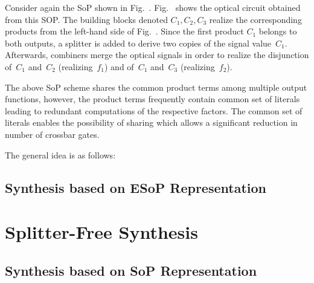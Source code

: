 \documentclass[10pt,letterpaper,twoside,openright]{book}
\begin{document}
\begin{example}
Consider again the SoP
shown in Fig.~.
Fig.~ shows the optical circuit obtained from this SOP.
The building blocks denoted $C_1, C_2, C_3$ realize the corresponding products from the left-hand side of Fig.~.
Since the first product $C_1$ belongs to both outputs, a splitter is added 
to derive two copies of the signal value~$C_1$. 
Afterwards, combiners merge the optical signals in order to realize the disjunction
of~$C_1$ and~$C_2$ (realizing~$f_1$) and of~$C_1$ and~$C_3$ (realizing~$f_2$).
\end{example} 

The above SoP scheme shares the common product terms among multiple output functions, however, the product terms frequently contain common set of literals leading to redundant computations of the respective factors. The common set of literals enables the possibility of sharing which allows a significant reduction in number of crossbar gates.

The general idea is as follows: 



\subsection{Synthesis based on ESoP Representation}

\newpage

\section{Splitter-Free Synthesis}

\newpage

\subsection{Synthesis based on SoP Representation}
\end{document}
